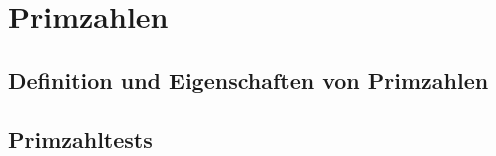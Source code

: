 \section{Primzahlen}

\subsection{Definition und Eigenschaften von Primzahlen}

\subsection{Primzahltests}
